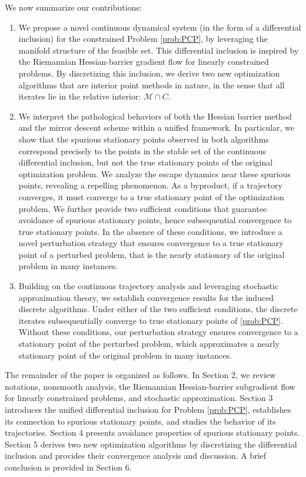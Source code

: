 \documentclass[11pt]{article}
\newcommand{\cM}{\mathcal M}
\begin{document}
We now summarize our contributions:
\begin{enumerate}
    \item We propose a novel continuous dynamical system (in the form of a differential inclusion) for the constrained Problem \eqref{prob:PCP}, by leveraging the manifold structure of the feasible set. This differential inclusion is inspired by the Riemannian Hessian-barrier gradient flow for linearly constrained problems. By discretizing this inclusion, we derive two new optimization algorithms that are interior point methods in nature, in the sense that all iterates lie in the relative interior: \(\cM\cap C\).
    \item We interpret the pathological behaviors of both the Hessian barrier method and the mirror descent scheme within a unified framework. In particular, we show that the spurious stationary points observed in both algorithms correspond precisely to the points in the stable set of the continuous differential inclusion, but not the true stationary points of the original optimization problem. We analyze the escape dynamics near these spurious points, revealing a repelling phenomenon. As a byproduct, if a trajectory converges, it must converge to a true stationary point of the optimization problem. We further provide two sufficient conditions that guarantee avoidance of spurious stationary points, hence subsequential convergence to true stationary points. In the absence of these conditions, we introduce a novel perturbation strategy that ensures convergence to a true stationary point of a perturbed problem, that is the nearly stationary of the original problem in many instances.
    \item Building on the continuous trajectory analysis and leveraging stochastic approximation theory, we establish convergence results for the induced discrete algorithms. Under either of the two sufficient conditions, the discrete iterates subsequentially converge to true stationary points of \eqref{prob:PCP}. Without these conditions, our perturbation strategy ensures convergence to a stationary point of the perturbed problem, which approximates a nearly stationary point of the original problem in many instances.
\end{enumerate}

 
The remainder of the paper is organized as follows. In Section 2, we review notations, nonsmooth analysis, the Riemannian Hessian-barrier subgradient flow for linearly constrained problems, and stochastic approximation. Section 3 introduces the unified differential inclusion for Problem \eqref{prob:PCP}, establishes its connection to spurious stationary points, and studies the behavior of its trajectories. Section 4 presents avoidance properties of spurious stationary points. Section 5 derives two new optimization algorithms by discretizing the differential inclusion and provides their convergence analysis and discussion. A brief conclusion is provided in Section 6.
\end{document}
